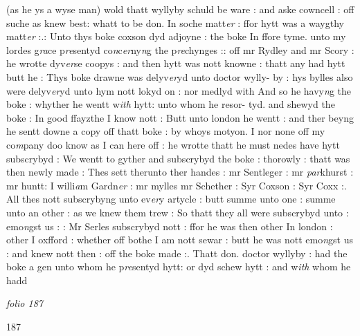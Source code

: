 \documentclass[12pt, a4paper]{book}
\begin{document}
            			
		\ifthenelse{\isodd{\thepage}}
		{\reversemarginpar}
		{\normalmarginpar}
		(as he ys a wyse man) wold thatt wyllyby schuld be ware : and aske cowncell : off suche as knew best: whatt to be don. In soche matt\textit{er }: ffor hytt was a waygthy matt\textit{er} :.: Unto thys boke coxson dyd adjoyne : the boke In ffore tyme. unto my lordes g\textit{ra}ce p\textit{re}sentyd co\textit{n}c\textit{er}ny\textit{n}g the p\textit{re}chynges :: off mr Rydley and mr Scory : he wrotte dyv\textit{er}se coopys : and then hytt was nott knowne : thatt any had hytt butt he : Thys boke drawne was delyv\textit{er}yd unto doctor wylly- by : hys bylles also were delyv\textit{er}yd unto hym nott lokyd on : nor medlyd with And so he havy\textit{n}g the boke : whyther he wentt w\textit{ith} hytt: unto whom he resor- tyd. and shewyd the boke : In good ffayzthe I know nott : Butt unto  london he wentt : and ther beyng he sentt downe a copy off thatt boke : by whoys motyon. I nor none off my co\textit{m}pany doo know as I can here off 
			: he wrotte thatt he must nedes have hytt subscrybyd : We wentt to gyther and subscrybyd the boke : thorowly : thatt was then newly made : Thes sett therunto ther handes : mr Sentleger : mr \textit{par}khurst : mr huntt: I willi\textit{a}m Gardn\textit{er} : mr mylles mr Schether : Syr Coxson : Syr Coxx :. All thes nott subscrybyng unto ev\textit{er}y artycle : butt summe unto one : summe unto an other : as we knew them trew : So thatt they all were subscrybyd unto : emo\textit{n}gst us : : Mr Serles subscrybyd nott : ffor he was then other In london :
			 other I oxfford : whether off bothe I am nott sewar : butt he was nott emo\textit{n}gst us : and knew nott then : off the boke made :. Thatt don. doctor wyllyby : had the boke a gen  unto whom he p\textit{re}sentyd hytt: or dyd schew hytt : and w\textit{ith} whom he hadd
            		
\dotfill
						\newpage
{}

\textit{folio 187}
            		
            		
            		\begin{flushright}{\color{Mahogany}187}\end{flushright}
            		
\end{document}
